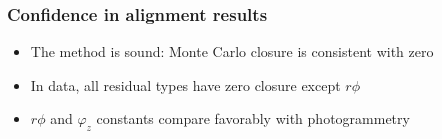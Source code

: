 \documentclass[compress]{beamer}
\begin{document}
\begin{frame}
\frametitle{Confidence in alignment results}

\begin{itemize}
\item The method is sound: Monte Carlo closure is consistent with zero
\item In data, all residual types have zero closure except $r\phi$
\item $r\phi$ and $\varphi_z$ constants compare favorably with photogrammetry
\end{itemize}



\end{frame}
\end{document}
